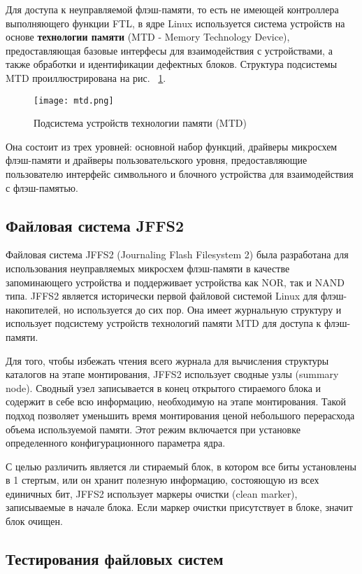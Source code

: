 Для доступа к неуправляемой флэш-памяти, то есть не имеющей контроллера выполняющего функции FTL, в ядре Linux используется система устройств на основе \textbf{технологии памяти} (MTD - Memory Technology Device), предоставляющая базовые интерфесы для взаимодействия с устройствами, а также обработки и идентификации дефектных блоков. Структура подсистемы MTD проиллюстрирована на рис. ~\ref{mtd}.

\begin{figure}[H]
	\centering
	\texttt{[image: mtd.png]}
	\caption{Подсистема устройств технологии памяти (MTD)}
	\label{mtd}
\end{figure}

Она состоит из трех уровней: основной набор функций, драйверы микросхем флэш-памяти и драйверы пользовательского уровня, предоставляющие пользователю интерфейс символьного и блочного устройства для взаимодействия с флэш-памятью. 

\subsection{Файловая система JFFS2}

Файловая система JFFS2 (Journaling Flash Filesystem 2) была разработана для использования неуправляемых микросхем флэш-памяти в качестве запоминающего устройства и поддерживает устройства как NOR, так и NAND типа. JFFS2 является исторически первой файловой системой Linux для флэш-накопителей, но используется до сих пор. Она имеет журнальную структуру и использует подсистему устройств технологий памяти MTD для доступа к флэш-памяти.

Для того, чтобы избежать чтения всего журнала для вычисления структуры каталогов на этапе монтирования, JFFS2 использует сводные узлы (summary node). Сводный узел записывается в конец открытого стираемого блока и содержит в себе всю информацию, необходимую на этапе монтирования. Такой подход позволяет уменьшить время монтирования ценой небольшого перерасхода объема используемой памяти. Этот режим включается при установке определенного конфигурационного параметра ядра.

С целью различить является ли стираемый блок, в котором все биты установлены в 1 стертым, или он хранит полезную информацию, состояющую из всех единичных бит, JFFS2 использует маркеры очистки (clean marker), записываемые в начале блока. Если маркер очистки присутствует в блоке, значит блок очищен.

\subsection{Тестирования файловых систем}

